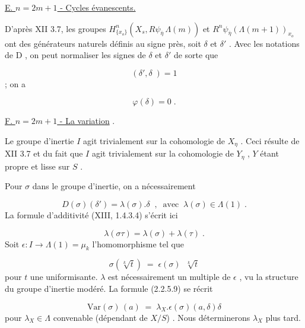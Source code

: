 \underline{E. \quad $n = 2m + 1$ \quad - Cycles évanescents.}

D'après XII 3.7, les groupes $H^n_{\{x_o\}}(X_s,R\psi_{\overline{\eta}} \, \Lambda(m))$ et $R^n\psi_{\overline{\eta}}(\Lambda(m+1))_{x_o}$ ont des générateurs naturels définis au signe près, soit $\delta$ et $\delta'$ . Avec les notations de D , on peut normaliser les signes de $\delta$ et $\delta'$ de sorte que

\begin{equation}\tag{2.2.5.7}
(\delta',\delta \;) = 1
\end{equation}
; on a

\begin{equation}\tag{2.2.5.8}
\varphi(\delta) = 0 \;.
\end{equation}

\underline{F. \quad $n = 2m + 1$ \quad - La variation} .

Le groupe d'inertie $I$ agit trivialement sur la cohomologie de $X_{\eta}$ . Ceci résulte de XII 3.7 et du fait que $I$ agit trivialement sur la cohomologie de $Y_{\eta}$ , $Y$ étant propre et lisse sur $S$ .

Pour $\sigma$ dans le groupe d'inertie, on a nécessairement

\begin{equation}\tag{2.2.5.9}
D(\sigma)(\delta') = \lambda(\sigma).\delta \;\; , \;\; \mathrm{avec} \;\; \lambda(\sigma) \in \Lambda(1) \;.
\end{equation}
La formule d'additivité (XIII, 1.4.3.4) s'écrit ici

\begin{equation*}
\lambda(\sigma\tau) = \lambda(\sigma) + \lambda(\tau) \;.
\end{equation*}
Soit $\epsilon : I \longrightarrow \Lambda(1) = \mu_k$ l'homomorphisme tel que

\begin{equation*}
\sigma(\sqrt[k]{t}) \;=\; \epsilon(\sigma) \;\; \sqrt[k]{t}
\end{equation*}
pour  $t$  une uniformisante.  $\lambda$  est nécessairement un multiple de  $\epsilon$ , vu la structure du groupe d'inertie modéré. La formule (2.2.5.9) se récrit

\begin{equation}\tag{2.2.5.10}
\mathrm{Var}(\sigma)\,(a) \;=\; \lambda_X . \epsilon(\sigma)(a,\delta)\delta
\end{equation}
pour  $\lambda_X \in \Lambda$  convenable (dépendant de  $X/S$) . Nous déterminerons  $\lambda_X$  plus tard.

